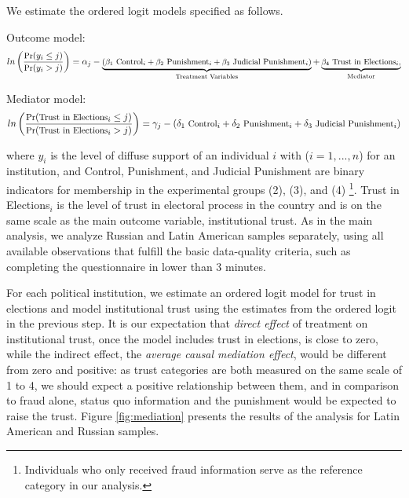 \documentclass[11pt, ngerman,english,a4]{article}
\begin{document}
\noindent We estimate the ordered logit models specified as follows.

\noindent Outcome model:
\begin{equation}
	\small
	ln \left (\frac{\text{Pr}(y_i \leq j)}{\text{Pr}(y_i > j)} \right) = \alpha_j - \underbrace{
		({\beta_1} {\text{ Control}_i} + 
		\beta_2 {\text{ Punishment}_i} + 
		\beta_3 {\text{ Judicial Punishment}_i})
		}_{\text{Treatment Variables}} +
	\underbrace{\beta_4 \text{ Trust in Elections}_i,}_{
		\text{Mediator}}
\end{equation}

\noindent Mediator model:
\begin{equation}
	\small
	ln \left (\frac{\text{Pr}(\text{Trust in Elections}_i \leq j)}{\text{Pr}(\text{Trust in Elections}_i > j)} \right) =\gamma_j - 
	({\delta_1} {\text{ Control}_i} + 
	\delta_2 {\text{ Punishment}_i} + 
	\delta_3 {\text{ Judicial Punishment}_i})
\end{equation}


\noindent where $y_i$ is the level of diffuse support of an individual $i$ with ($i=1,...,n$) for an institution, and Control, Punishment, and Judicial Punishment are binary indicators for membership in the experimental groups (2),  (3), and (4) \footnote{Individuals who only received fraud information serve as the reference category in our analysis.}. Trust in Elections$_i$ is the level of trust in electoral process in the country and is on the same scale as the main outcome variable, institutional trust. As in the main analysis, we analyze Russian and Latin American samples separately, using all available observations that fulfill the basic data-quality criteria, such as completing the questionnaire in lower than 3 minutes.
    
For each political institution, we estimate an ordered logit model for trust in elections and model institutional trust using the estimates from the ordered logit in the previous step. It is our expectation that \textit{direct effect} of treatment on institutional trust, once the model includes trust in elections, is close to zero, while the indirect effect, the \textit{average causal mediation effect}, would be different from zero and positive: as trust categories are both measured on the same scale of 1 to 4, we should expect a positive relationship between them, and in comparison to fraud alone, status quo information and the punishment would be expected to raise the trust. Figure \ref{fig:mediation} presents the results of the analysis for Latin American and Russian samples. 
\end{document}
